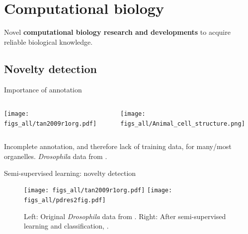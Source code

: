 \section{Computational biology}

\begin{frame}{}
  \begin{center}
    \Large{Novel \textbf{computational biology research and developments}
    to acquire reliable biological knowledge.}
  \end{center}
\end{frame}

\subsection{Novelty detection}

\begin{frame}{Importance of annotation}

  \begin{columns}[t]
    \begin{column}[T]{0.43\textwidth}
      \begin{centering}
        \texttt{[image: figs\_all/tan2009r1org.pdf]}
      \end{centering}
    \end{column}
    \begin{column}[T]{0.56\textwidth}
      \texttt{[image: figs\_all/Animal\_cell\_structure.png]}
    \end{column}
  \end{columns}
  Incomplete annotation, and therefore lack of training data, for
  many/most organelles. \textit{Drosophila} data from \cite{Tan2009}.
\end{frame}

\begin{frame}{Semi-supervised learning: novelty detection}
  \begin{figure}
    \texttt{[image: figs\_all/tan2009r1org.pdf]}
    \texttt{[image: figs\_all/pdres2fig.pdf]}
    \caption{Left: Original \textit{Drosophila} data from
      \cite{Tan2009}. Right: After semi-supervised learning and
      classification, \cite{Breckels:2013}.}
  \end{figure}
\end{frame}

